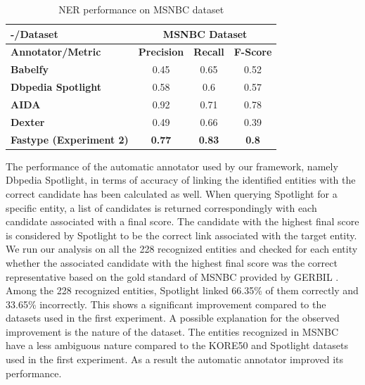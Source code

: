 \begin{table}[htbp]
  \centering
  \caption{NER performance on MSNBC dataset}
    \begin{tabular}{|l|c|c|c|}
    \toprule
    \textbf{-/Dataset} & \multicolumn{3}{c|}{\textbf{MSNBC Dataset}} \\
    \midrule
    \textbf{Annotator/Metric} & \multicolumn{1}{l|}{\textbf{Precision}} & \multicolumn{1}{l|}{\textbf{Recall}} & \multicolumn{1}{l|}{\textbf{F-Score}} \\
    \midrule
    \textbf{Babelfy} & 0.45  & 0.65  & 0.52 \\
    \midrule
    \textbf{Dbpedia Spotlight} & 0.58  & 0.6   & 0.57 \\
    \midrule
    \textbf{AIDA} & 0.92  & 0.71  & 0.78 \\
    \midrule
    \textbf{Dexter} & 0.49  & 0.66  & 0.39 \\
    \midrule
    \textbf{Fastype (Experiment 2)} & \textcolor[rgb]{ 1,  0,  0}{\textbf{0.77}} & \textcolor[rgb]{ 1,  0,  0}{\textbf{0.83}} & \textcolor[rgb]{ 1,  0,  0}{\textbf{0.8}} \\
    \bottomrule
    \end{tabular}%
  \label{tab:ex2-ner-performance}%
\end{table}%

The performance of the automatic annotator used by our framework, namely Dbpedia Spotlight, in terms of accuracy of linking the identified entities with the correct candidate has been calculated as well. When querying Spotlight for a specific entity, a list of candidates is returned correspondingly with each candidate associated with a final score. The candidate with the highest final score is considered by Spotlight to be the correct link associated with the target entity. We run our analysis on all the 228 recognized entities and checked for each entity whether the associated candidate with the highest final score was the correct representative based on the gold standard of MSNBC provided by GERBIL \cite{40}. Among the 228 recognized entities, Spotlight linked 66.35\% of them correctly and 33.65\% incorrectly. This shows a significant improvement compared to the datasets used in the first experiment. A possible explanation for the observed improvement is the nature of the dataset. The entities recognized in MSNBC have a less ambiguous nature compared to the KORE50 and Spotlight datasets used in the first experiment. As a result the automatic annotator improved its performance. 

